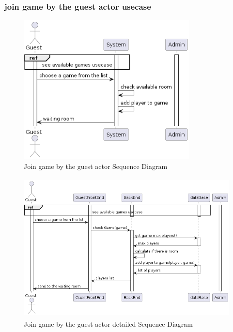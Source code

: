 \documentclass{article}
\begin{document}
\subsubsection{join game by the guest actor usecase}
\begin{figure}[H]
	\centering
	\includegraphics[height=3in]{../thesis_tex/assets/diagrams/guest_join_game_SD.png}
	\caption{Join game by the guest actor Sequence Diagram}
\end{figure}

\begin{figure}[H]
	\centering
	\includegraphics[height=3in]{../thesis_tex/assets/diagrams/guest_join_game_detailedSD.png}
	\caption{Join game by the guest actor detailed Sequence Diagram}
\end{figure}
\end{document}
